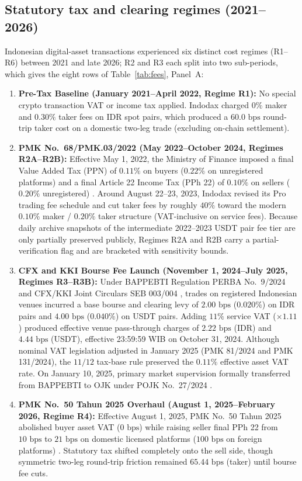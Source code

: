 \subsection{Statutory tax and clearing regimes (2021--2026)}
Indonesian digital-asset transactions experienced six distinct cost regimes (R1--R6) between 2021 and late 2026; R2 and R3 each split into two sub-periods, which gives the eight rows of Table~\ref{tab:fees}, Panel~A:
\begin{enumerate}
  \item \textbf{Pre-Tax Baseline (January 2021--April 2022, Regime R1):} No special crypto transaction VAT or income tax applied. Indodax charged $0\%$ maker and $0.30\%$ taker fees on IDR spot pairs, which produced a $60.0\text{ bps}$ round-trip taker cost on a domestic two-leg trade (excluding on-chain settlement).
  \item \textbf{PMK No.\ 68/PMK.03/2022 (May 2022--October 2024, Regimes R2A--R2B):} Effective May 1, 2022, the Ministry of Finance imposed a final Value Added Tax (PPN) of $0.11\%$ on buyers ($0.22\%$ on unregistered platforms) and a final Article 22 Income Tax (PPh 22) of $0.10\%$ on sellers ($0.20\%$ unregistered) \citep{pmk68_2022}. Around August 22--23, 2023, Indodax revised its Pro trading fee schedule and cut taker fees by roughly $40\%$ toward the modern $0.10\%$ maker / $0.20\%$ taker structure (VAT-inclusive on service fees). Because daily archive snapshots of the intermediate 2022--2023 USDT pair fee tier are only partially preserved publicly, Regimes R2A and R2B carry a partial-verification flag and are bracketed with sensitivity bounds.
  \item \textbf{CFX and KKI Bourse Fee Launch (November 1, 2024--July 2025, Regimes R3--R3B):} Under BAPPEBTI Regulation PERBA No.\ 9/2024 and CFX/KKI Joint Circulars SEB 003/004 \citep{perba9_2024,indodax_fees_2026}, trades on registered Indonesian venues incurred a base bourse and clearing levy of $2.00\text{ bps}$ ($0.020\%$) on IDR pairs and $4.00\text{ bps}$ ($0.040\%$) on USDT pairs. Adding $11\%$ service VAT ($\times 1.11$) produced effective venue pass-through charges of $2.22\text{ bps}$ (IDR) and $4.44\text{ bps}$ (USDT), effective 23:59:59 WIB on October 31, 2024. Although nominal VAT legislation adjusted in January 2025 (PMK 81/2024 and PMK 131/2024), the $11/12$ tax-base rule preserved the $0.11\%$ effective asset VAT rate. On January 10, 2025, primary market supervision formally transferred from BAPPEBTI to OJK under POJK No.\ 27/2024 \citep{pojk27_2024}.
  \item \textbf{PMK No.\ 50 Tahun 2025 Overhaul (August 1, 2025--February 2026, Regime R4):} Effective August 1, 2025, PMK No.\ 50 Tahun 2025 abolished buyer asset VAT ($0\text{ bps}$) while raising seller final PPh 22 from $10\text{ bps}$ to $21\text{ bps}$ on domestic licensed platforms ($100\text{ bps}$ on foreign platforms) \citep{pmk50_2025}. Statutory tax shifted completely onto the sell side, though symmetric two-leg round-trip friction remained $65.44\text{ bps}$ (taker) until bourse fee cuts.

\end{enumerate}
